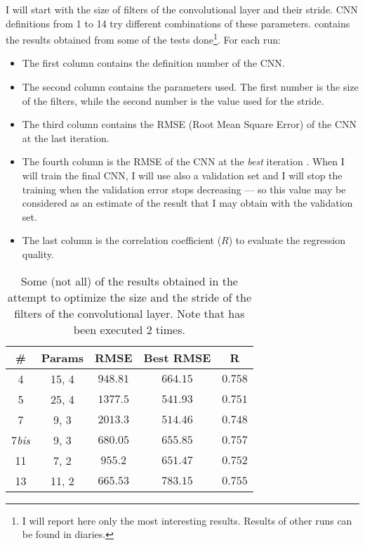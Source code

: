 I will start with the size of filters of the convolutional layer and their
stride. CNN definitions from 1 to 14 try different combinations of these
parameters.  contains the results obtained
from some of the tests done\footnote{I will report here only the most
interesting results. Results of other runs can be found in diaries.}. For each
run:
\begin{itemize}
	\item The first column contains the definition number of the CNN.
	\item The second column contains the parameters used. The first number
		is the size of the filters, while the second number is the
		value used for the stride.
	\item The third column contains the RMSE (Root Mean Square Error) of
		the CNN at the last iteration.
	\item The fourth column is the RMSE of the CNN at the \emph{best}
		iteration . When I will train the final CNN, I will use
		also a validation set and I will stop the training when the
		validation error stops decreasing --- so this value may be
		considered as an estimate of the result that I may obtain with
		the validation set.
	\item The last column is the correlation coefficient (\(R\)) to
		evaluate the regression quality.
\end{itemize}

\begin{table}[hbtp]
	\centering
	\begin{tabular}{|c|c|c|c|c|}
		\toprule
		\# & Params & RMSE & Best RMSE & R \\
		\midrule
		4 & 15, 4 & \(948.81\) & \(664.15\) & \(0.758\) \\
		5 & 25, 4 & \(1377.5\) & \(541.93\) & \(0.751\) \\
		7 & 9, 3 & \(2013.3\) & \(514.46\) & \(0.748\) \\
		7\emph{bis} & 9, 3 & \(680.05\) & \(655.85\) & \(0.757\) \\
		11 & 7, 2 & \(955.2\) & \(651.47\) & \(0.752\) \\
		13 & 11, 2 & \(665.53\) & \(783.15\) & \(0.755\) \\
		\bottomrule
	\end{tabular}
	\caption{Some (not all) of the results obtained in the attempt to
	optimize the size and the stride of the filters of the convolutional
	layer. Note that  has been executed 2
	times.}\label{table:cnnfiltersizestride}
\end{table}

